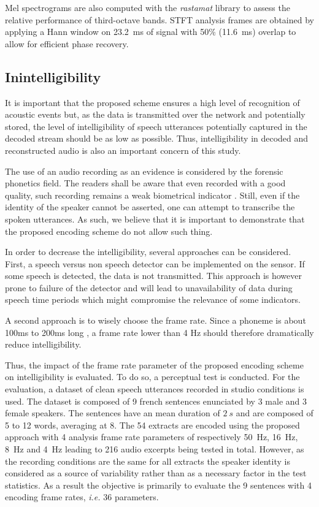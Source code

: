 \documentclass[sensors,article,submit,moreauthors,pdftex,10pt,a4paper]{mdpi}
\begin{document}
Mel spectrograms are also computed with the \textit{rastamat} library \cite{ellis2005} to assess the relative performance of third-octave bands. STFT analysis frames are obtained by applying a Hann window on 23.2~ms of signal with 50\% (11.6~ms) overlap to allow for efficient phase recovery.

\subsection{Inintelligibility} \label{sec:inintelligibility_p}

It is important that the proposed scheme ensures a high level of recognition of acoustic events but, as the data is transmitted over the network and potentially stored, the level of intelligibility of  speech utterances potentially captured in the decoded stream should be as low as possible. Thus, intelligibility in decoded and reconstructed audio is also an important concern of this study.

The use of an audio recording as an evidence is considered by the forensic phonetics \cite{baldwin1990forensic} field. The readers shall be aware that even recorded with a good quality, such recording remains a weak biometrical indicator \cite{boe2000forensic}. Still, even if the identity of the speaker cannot be asserted, one can attempt to transcribe the spoken utterances. As such, we believe that it is important to demonstrate that the proposed encoding scheme do not allow such thing.

In order to decrease the intelligibility, several approaches can be considered. First, a speech versus non speech detector can be implemented on the sensor. If some speech is detected, the data is not transmitted. This approach is however prone to failure of the detector and will lead to unavailability of data during speech time periods which might compromise the relevance of some indicators.

A second approach is to wisely choose the frame rate. Since a phoneme is about 100ms to 200ms long \cite{kuwabara1996acoustic} \cite{rosen1992temporal}, a frame rate lower than 4 Hz should therefore dramatically reduce intelligibility.

Thus, the impact of the frame rate parameter of the proposed encoding scheme on intelligibility is evaluated. To do so, a perceptual test is conducted. For the evaluation, a dataset of clean speech utterances recorded in studio conditions is used. The dataset is composed of 9 french sentences enunciated by 3 male and 3 female speakers. The sentences have an mean duration of $2~s$ and are composed of 5 to 12 words, averaging at 8. The 54 extracts are encoded using the proposed approach with 4 analysis frame rate parameters of respectively 50~Hz, 16~Hz, 8~Hz and 4~Hz leading to 216 audio excerpts being tested in total. However, as the recording conditions are the same for all extracts the speaker identity is considered as a source of variability rather than as a necessary factor in the test statistics. As a result the objective is primarily to evaluate the 9 sentences with 4 encoding frame rates, \textit{i.e.} 36 parameters.
\end{document}
